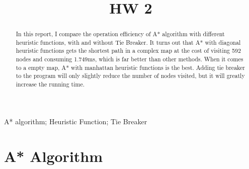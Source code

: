 \documentclass[conference]{IEEEtran}
\begin{document}
\title{HW 2\\
}

\author{
}

\maketitle

\begin{abstract}
In this report, I compare the operation efficiency of A* algorithm with different heuristic functions, with and without Tie Breaker. It turns out that A* with diagonal heuristic functions gets the shortest path in a complex map at the cost of visiting 592 nodes and consuming 1.749ms, which is far better than other methods. When it comes to a empty map, A* with manhattan heuristic functions is the best. Adding tie breaker to the program will only slightly reduce the number of nodes visited, but it will greatly increase the running time.
\end{abstract}

\begin{IEEEkeywords}
A* algorithm; Heuristic Function; Tie Breaker
\end{IEEEkeywords}


\section{A* Algorithm}
\end{document}
